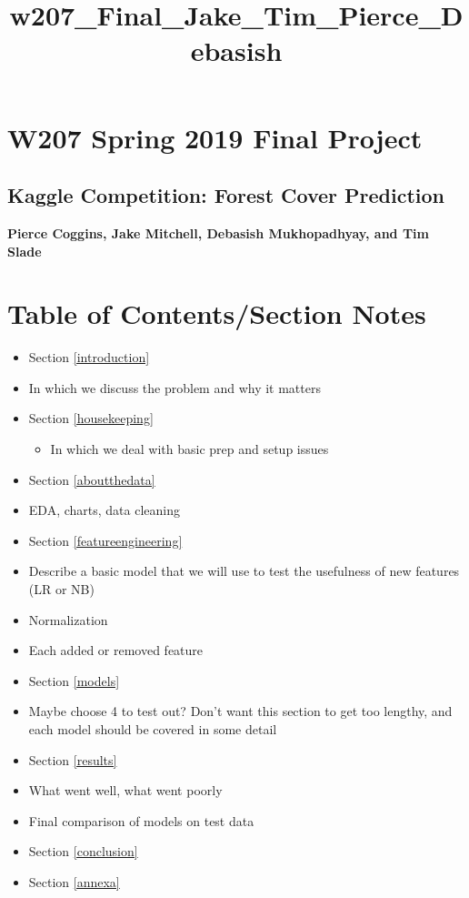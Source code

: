 \documentclass[11pt]{article}
\title{w207\_Final\_Jake\_Tim\_Pierce\_Debasish}
\providecommand{\tightlist}{%
      \setlength{\itemsep}{0pt}\setlength{\parskip}{0pt}}
\begin{document}
    
    
    \maketitle
    
    

    
    \section{W207 Spring 2019 Final
Project}\label{w207-spring-2019-final-project}

\subsection{Kaggle Competition: Forest Cover
Prediction}\label{kaggle-competition-forest-cover-prediction}

\textbf{Pierce Coggins, Jake Mitchell, Debasish Mukhopadhyay, and Tim
Slade}

    \section{Table of Contents/Section
Notes}\label{table-of-contentssection-notes}

    \begin{itemize}
\tightlist
\item
  Section \ref{introduction}
\item
  In which we discuss the problem and why it matters
\item
  Section \ref{housekeeping}

  \begin{itemize}
  \tightlist
  \item
    In which we deal with basic prep and setup issues
  \end{itemize}
\item
  Section \ref{aboutthedata}
\item
  EDA, charts, data cleaning
\item
  Section \ref{featureengineering}
\item
  Describe a basic model that we will use to test the usefulness of new
  features (LR or NB)
\item
  Normalization
\item
  Each added or removed feature
\item
  Section \ref{models}
\item
  Maybe choose 4 to test out? Don't want this section to get too
  lengthy, and each model should be covered in some detail
\item
  Section \ref{results}
\item
  What went well, what went poorly
\item
  Final comparison of models on test data
\item
  Section \ref{conclusion}
\item
  Section \ref{annexa}
\end{itemize}
\end{document}
